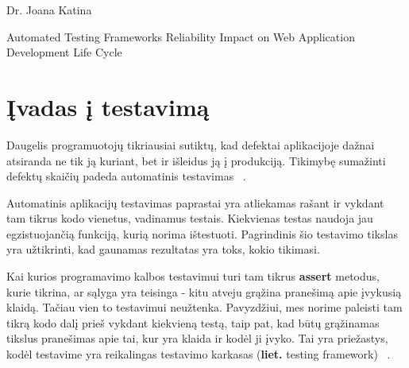 \documentclass[a4paper,12pt,fleqn]{article}
\begin{document}
 {}{}{}{}%
 {Dr. Joana Katina}

\tableofcontents

\bothabstracts{}%
{Automated Testing Frameworks Reliability Impact on Web Application Development Life Cycle} %
{}%






\newpage
\section{Įvadas į testavimą}
Daugelis programuotojų tikriausiai sutiktų, kad defektai aplikacijoje dažnai atsiranda ne tik ją kuriant, bet ir išleidus ją į produkciją. Tikimybę sumažinti defektų skaičių padeda automatinis testavimas ~\cite{huizinga2007automated}.

Automatinis aplikacijų testavimas paprastai yra atliekamas rašant ir vykdant tam tikrus kodo vienetus, vadinamus testais. Kiekvienas testas naudoja jau egzistuojančią funkciją, kurią norima ištestuoti. Pagrindinis šio testavimo tikslas yra užtikrinti, kad gaunamas rezultatas yra toks, kokio tikimasi.

Kai kurios programavimo kalbos testavimui turi tam tikrus \textbf{assert} metodus, kurie tikrina, ar sąlyga yra teisinga - kitu atveju grąžina pranešimą apie įvykusią klaidą. Tačiau vien to testavimui neužtenka. Pavyzdžiui, mes norime paleisti tam tikrą kodo dalį prieš vykdant kiekvieną testą, taip pat, kad būtų grąžinamas tikslus pranešimas apie tai, kur yra klaida ir kodėl ji įvyko. Tai yra priežastys, kodėl testavime yra reikalingas testavimo karkasas (\textbf{liet.} testing framework) ~\cite{inproceedings}.
\end{document}
